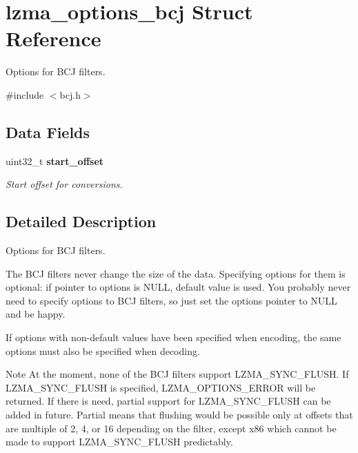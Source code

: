 \section{lzma\-\_\-options\-\_\-bcj Struct Reference}
\label{structlzma__options__bcj}


Options for B\-C\-J filters.  




{\ttfamily \#include $<$bcj.\-h$>$}

\subsection*{Data Fields}
\begin{DoxyCompactItemize}
\item 
uint32\-\_\-t {\bf start\-\_\-offset}
\begin{DoxyCompactList}\small\item\em Start offset for conversions. \end{DoxyCompactList}\end{DoxyCompactItemize}


\subsection{Detailed Description}
Options for B\-C\-J filters. 

The B\-C\-J filters never change the size of the data. Specifying options for them is optional\-: if pointer to options is N\-U\-L\-L, default value is used. You probably never need to specify options to B\-C\-J filters, so just set the options pointer to N\-U\-L\-L and be happy.

If options with non-\/default values have been specified when encoding, the same options must also be specified when decoding.

\begin{DoxyNote}{Note}
At the moment, none of the B\-C\-J filters support L\-Z\-M\-A\-\_\-\-S\-Y\-N\-C\-\_\-\-F\-L\-U\-S\-H. If L\-Z\-M\-A\-\_\-\-S\-Y\-N\-C\-\_\-\-F\-L\-U\-S\-H is specified, L\-Z\-M\-A\-\_\-\-O\-P\-T\-I\-O\-N\-S\-\_\-\-E\-R\-R\-O\-R will be returned. If there is need, partial support for L\-Z\-M\-A\-\_\-\-S\-Y\-N\-C\-\_\-\-F\-L\-U\-S\-H can be added in future. Partial means that flushing would be possible only at offsets that are multiple of 2, 4, or 16 depending on the filter, except x86 which cannot be made to support L\-Z\-M\-A\-\_\-\-S\-Y\-N\-C\-\_\-\-F\-L\-U\-S\-H predictably. 
\end{DoxyNote}


